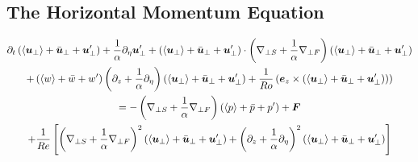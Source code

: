 \documentclass{article}
\begin{document}
\subsection{The Horizontal Momentum Equation}

\begin{multline}
    \partial_t \upexp + \frac{1}{\alpha}\partial_{\eta} \uvec_{\perp}' +
    \upexp\cdot\left(\gradhs + \frac{1}{\alpha}\gradhf\right)\upexp \\
    + \wexp\left(\partial_z + \frac{1}{\alpha}\partial_{\eta}\right)\upexp +
    \frac{1}{Ro}\left(\ez \times \upexp)\right) \\
    = -\left(\gradhs +
    \frac{1}{\alpha}\gradhf\right) \pexp + \F \\
    +\frac{1}{Re}\left[\left(\gradhs +
    \frac{1}{\alpha}\gradhf\right)^2\upexp + \left(\partial_z +
    \frac{1}{\alpha}\partial_{\eta}\right)^2\upexp\right]\label{eq:up_exp}
\end{multline}
\end{document}
